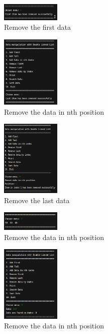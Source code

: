 \documentclass[12pt,titlepage]{article}
\begin{document}
\begin{enumerate}
{        \pagebreak

        \begin{figure}[h]
            \centering
            \includegraphics[width=0.25\textwidth]{./images/1-4.png}
            \caption{Remove the first data}
        \end{figure}

        \begin{figure}[h]
            \centering
            \includegraphics[width=0.25\textwidth]{./images/1-5.png}
            \caption{Remove the data in nth position}
        \end{figure}

        \begin{figure}[h]
            \centering
            \includegraphics[width=0.25\textwidth]{./images/1-6.png}
            \caption{Remove the last data}
        \end{figure}

        \pagebreak

        \begin{figure}[h]
            \centering
            \includegraphics[width=0.25\textwidth]{./images/1-7.png}
            \caption{Remove the data in nth position}
        \end{figure}

        \begin{figure}[h]
            \centering
            \includegraphics[width=0.25\textwidth]{./images/1-8.png}
            \caption{Remove the data in nth position}
        \end{figure}

}
\end{enumerate}
\end{document}
